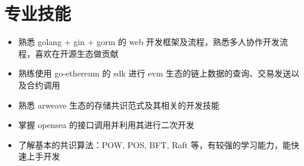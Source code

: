 \documentclass[letterpaper,11pt]{ctexart}
\makeatletter
\newcommand{\resumeItem}[1]{
  \item\small{
    {#1 \vspace{-2pt}}
  }
}
\newcommand{\resumeSubheading}[4]{
  \vspace{-2pt}\item
    \begin{tabular*}{1.0\textwidth}[t]{l@{\extracolsep{\fill}}r}
      \textbf{#1} & \textbf{\small #2} \\
      \textit{\small#3} & \textit{\small #4} \\
    \end{tabular*}\vspace{-7pt}
}
\newcommand{\resumeSubHeadingListStart}{\begin{itemize}[leftmargin=0.0in, label={}]}
\newcommand{\resumeSubHeadingListEnd}{\end{itemize}}
\newcommand{\resumeItemListStart}{\begin{itemize}}
\newcommand{\resumeItemListEnd}{\end{itemize}\vspace{-5pt}}
\makeatother
\begin{document}
\section{专业技能}
    \resumeItemListStart
    \resumeItem{熟悉 golang + gin + gorm 的 web 开发框架及流程，熟悉多人协作开发流程，喜欢在开源生态做贡献}
    \resumeItem{熟练使用 go-ethereum 的 sdk 进行 evm 生态的链上数据的查询、交易发送以及合约调用}
    \resumeItem{熟悉 arweave 生态的存储共识范式及其相关的开发技能}
    \resumeItem{掌握 opensea 的接口调用并利用其进行二次开发}
    \resumeItem{了解基本的共识算法：POW, POS, BFT, Raft 等，有较强的学习能力，能快速上手开发}
    \resumeItemListEnd
 \vspace{-16pt}


%
\end{document}
